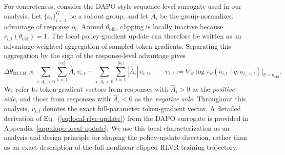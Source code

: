 \documentclass{llmxive}
\providecommand{\Eq}[1]{Eq.~(\ref{#1})}
\begin{document}
For concreteness, consider the DAPO-style sequence-level surrogate used in our analysis. 
Let \(\{o_i\}_{i=1}^G\) be a rollout group, and let \(\hat A_i\) be the group-normalized advantage of response \(o_i\). 
Around \(\theta_{\mathrm{old}}\), clipping is locally inactive because \(r_{i,t}(\theta_{\mathrm{old}})=1\). 
The local policy-gradient update can therefore be written as an advantage-weighted aggregation of sampled-token gradients. 
Separating this aggregation by the sign of the response-level advantage gives
\begin{equation}
\label{eq:local-rlvr-update}
\Delta\theta_{\mathrm{RLVR}}
\propto
\sum_{i:\hat A_i>0}\sum_{t=1}^{|o_i|}
\hat A_i\,v_{i,t}
-
\sum_{i:\hat A_i<0}\sum_{t=1}^{|o_i|}
|\hat A_i|\,v_{i,t},
\qquad
v_{i,t}:=
\nabla_\theta
\log \pi_\theta(o_{i,t}\mid q,o_{i,<t})
\Big|_{\theta=\theta_{\mathrm{old}}}.
\end{equation}
We refer to token-gradient vectors from responses with \(\hat A_i>0\) as the \emph{positive side}, and those from responses with \(\hat A_i<0\) as the \emph{negative side}. 
Throughout this analysis, \(v_{i,t}\) denotes the exact full-parameter token-gradient vector. 
A detailed derivation of \Eq{eq:local-rlvr-update} from the DAPO surrogate is provided in Appendix~\ref{app:dapo-local-update}. We use this local characterization as an analysis and design principle for shaping the policy-update direction, rather than as an exact description of the full nonlinear clipped RLVR training trajectory.
\end{document}
